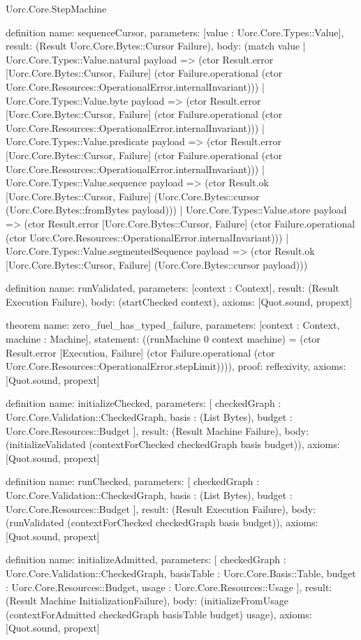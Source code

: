 \begin{lexlean}{Uorc.Core.StepMachine}
\begin{semanticmodule}
definition{
  name: sequenceCursor,
  parameters: [value : Uorc.Core.Types::Value],
  result: (Result Uorc.Core.Bytes::Cursor Failure),
  body: (match value
    | Uorc.Core.Types::Value.natural payload => (ctor Result.error [Uorc.Core.Bytes::Cursor, Failure] (ctor Failure.operational (ctor Uorc.Core.Resources::OperationalError.internalInvariant)))
    | Uorc.Core.Types::Value.byte payload => (ctor Result.error [Uorc.Core.Bytes::Cursor, Failure] (ctor Failure.operational (ctor Uorc.Core.Resources::OperationalError.internalInvariant)))
    | Uorc.Core.Types::Value.predicate payload => (ctor Result.error [Uorc.Core.Bytes::Cursor, Failure] (ctor Failure.operational (ctor Uorc.Core.Resources::OperationalError.internalInvariant)))
    | Uorc.Core.Types::Value.sequence payload => (ctor Result.ok [Uorc.Core.Bytes::Cursor, Failure] (Uorc.Core.Bytes::cursor (Uorc.Core.Bytes::fromBytes payload)))
    | Uorc.Core.Types::Value.store payload => (ctor Result.error [Uorc.Core.Bytes::Cursor, Failure] (ctor Failure.operational (ctor Uorc.Core.Resources::OperationalError.internalInvariant)))
    | Uorc.Core.Types::Value.segmentedSequence payload => (ctor Result.ok [Uorc.Core.Bytes::Cursor, Failure] (Uorc.Core.Bytes::cursor payload)))
}

definition{
  name: runValidated,
  parameters: [context : Context],
  result: (Result Execution Failure),
  body: (startChecked context),
  axioms: [Quot.sound, propext]
}

theorem{
  name: zero_fuel_has_typed_failure,
  parameters: [context : Context, machine : Machine],
  statement: ((runMachine 0 context machine) = (ctor Result.error [Execution, Failure] (ctor Failure.operational (ctor Uorc.Core.Resources::OperationalError.stepLimit)))),
  proof: reflexivity{},
  axioms: [Quot.sound, propext]
}

definition{
  name: initializeChecked,
  parameters: [
    checkedGraph : Uorc.Core.Validation::CheckedGraph,
    basis : (List Bytes),
    budget : Uorc.Core.Resources::Budget
  ],
  result: (Result Machine Failure),
  body: (initializeValidated (contextForChecked checkedGraph basis budget)),
  axioms: [Quot.sound, propext]
}

definition{
  name: runChecked,
  parameters: [
    checkedGraph : Uorc.Core.Validation::CheckedGraph,
    basis : (List Bytes),
    budget : Uorc.Core.Resources::Budget
  ],
  result: (Result Execution Failure),
  body: (runValidated (contextForChecked checkedGraph basis budget)),
  axioms: [Quot.sound, propext]
}

definition{
  name: initializeAdmitted,
  parameters: [
    checkedGraph : Uorc.Core.Validation::CheckedGraph,
    basisTable : Uorc.Core.Basis::Table,
    budget : Uorc.Core.Resources::Budget,
    usage : Uorc.Core.Resources::Usage
  ],
  result: (Result Machine InitializationFailure),
  body: (initializeFromUsage (contextForAdmitted checkedGraph basisTable budget) usage),
  axioms: [Quot.sound, propext]
}


\end{semanticmodule}
\end{lexlean}
